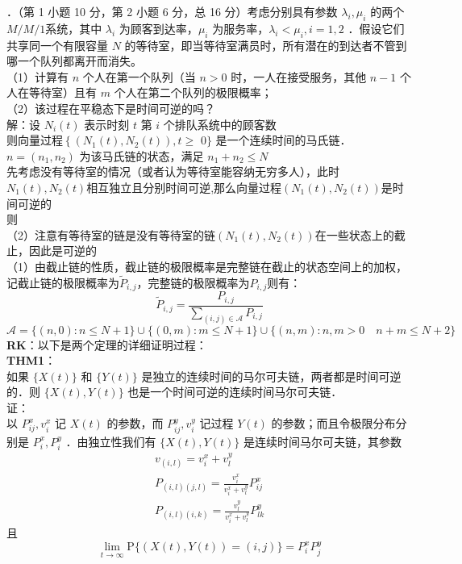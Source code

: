 \documentclass[UTF8]{ctexart}
\begin{document}
．（第 1 小题 10 分，第 2 小题 6 分，总 16 分）考虑分别具有参数 $\lambda_i, \mu_i$ 的两个 $M / M / 1$系统，其中 $\lambda_i$ 为顾客到达率，$\mu_i$ 为服务率，$\lambda_i<\mu_i, i=1,2$ ．假设它们共享同一个有限容量 $N$ 的等待室，即当等待室满员时，所有潜在的到达者不管到哪一个队列都离开而消失。\\
（1）计算有 $n$ 个人在第一个队列（当 $n>0$ 时，一人在接受服务，其他 $n-1$ 个人在等待室）且有 $m$ 个人在第二个队列的极限概率；\\
（2）该过程在平稳态下是时间可逆的吗？\\
解：设 $N_i(t)$ 表示时刻 $t$ 第 $i$ 个排队系统中的顾客数\\
则向量过程$\left\{\left(N_1(t), N_2(t)\right), t \geq\right.$ $0\}$ 是一个连续时间的马氏链．$n=\left(n_1, n_2\right)$ 为该马氏链的状态，满足 $n_1+n_2 \leq N$ \\
先考虑没有等待室的情况（或者认为等待室能容纳无穷多人），此时$N_1(t),N_2(t)$相互独立且分别时间可逆,那么向量过程$\left(N_1(t), N_2(t)\right)$是时间可逆的\\
则\\
（2）注意有等待室的链是没有等待室的链$\left(N_1(t), N_2(t)\right)$在一些状态上的截止，因此是可逆的\\
（1）由截止链的性质，截止链的极限概率是完整链在截止的状态空间上的加权，记截止链的极限概率为$\tilde{P}_{i,j}$，完整链的极限概率为$P_{i,j}$则有：\\
\[
\tilde{P}_{i,j}=\frac{P_{i,j}}{\sum\limits_{(i,j) \in \mathcal{A}}^{} P_{i,j}} 
\]
\[
\mathcal{A}=\{(n,0):n\le N+1 \} \cup \{ (0,m):m \le N+1\} \cup \{ (n,m):n,m>0\quad n+m \le N+2\}
\]
\textbf{RK}：以下是两个定理的详细证明过程：\\
\textbf{THM1}：\\
如果 $\{X(t)\}$ 和 $\{Y(t)\}$ 是独立的连续时间的马尔可夫链，两者都是时间可逆的．则 $\{X(t), Y(t)\}$ 也是一个时间可逆的连续时间马尔可夫链．\\
证：\\
以 $P_{i j}^x, v_i^x$ 记 $X(t)$ 的参数，而 $P_{i j}^y, v_i^y$ 记过程 $Y(t)$ 的参数；而且令极限分布分别是 $P_i^x, P_i^y$ ．由独立性我们有 $\{X(t), Y(t)\}$ 是连续时间马尔可夫链，其参数
$$
\begin{gathered}
	v_{(i, l)}=v_i^x+v_l^y \\
	P_{(i, l)(j, l)}=\frac{v_i^x}{v_i^x+v_l^y} P_{i j}^x\\
	P_{(i, l)(i, k)}=\frac{v_l^y}{v_i^x+v_l^y} P_{l k}^y
\end{gathered}
$$
且
$$
\lim _{t \rightarrow \infty} \mathrm{P}\{(X(t), Y(t))=(i, j)\}=P_i^x P_j^y
$$
\end{document}
